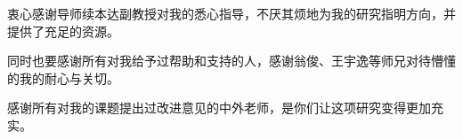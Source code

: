 
\begin{acknowledgements}
    衷心感谢导师续本达副教授对我的悉心指导，不厌其烦地为我的研究指明方向，并提供了充足的资源。

    同时也要感谢所有对我给予过帮助和支持的人，感谢翁俊、王宇逸等师兄对待懵懂的我的耐心与关切。
  
    感谢所有对我的课题提出过改进意见的中外老师，是你们让这项研究变得更加充实。
\end{acknowledgements}
